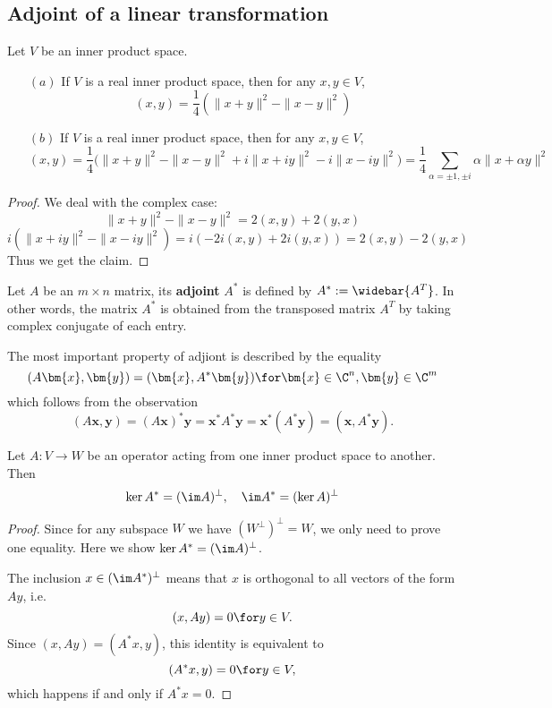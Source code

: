 \subsection{Adjoint of a linear transformation}
\begin{proposition}
Let $V$ be an inner product space.
\begin{itemize}
\item[$(a)$] If $V$ is a real inner product space, then for any $x,y\in V$,
\[(x,y)=\frac{1}{4}(\|x+y\|^2-\|x-y\|^2)\]
\item[$(b)$] If $V$ is a real inner product space, then for any $x,y\in V$,
\[(x,y)=\frac{1}{4}\Big(\|x+y\|^2-\|x-y\|^2+i\|x+iy\|^2-i\|x-iy\|^2\Big)=\frac{1}{4}\sum_{\alpha=\pm 1,\pm i}\alpha\|x+\alpha y\|^2\]
\end{itemize}
\end{proposition}
\begin{proof}
We deal with the complex case:
\[\|x+y\|^2-\|x-y\|^2=2(x,y)+2(y,x)\]
\[i(\|x+iy\|^2-\|x-iy\|^2)=i(-2i(x,y)+2i(y,x))=2(x,y)-2(y,x)\]
Thus we get the claim.
\end{proof}
\begin{definition}
Let $A$ be an $m\times n$ matrix, its \textbf{adjoint} $A^*$ is defined by $A^*:=\widebar{A^T}$. In other words, the matrix $A^*$ is obtained from the transposed matrix $A^T$ by taking complex conjugate of each entry.
\end{definition}
The most important property of adjiont is described by the equality
\[(A\bm{x},\bm{y})=(\bm{x},A^*\bm{y})\for \bm{x}\in\C^n,\bm{y}\in\C^m\]
which follows from the observation
\[(A\bm{x},\bm{y})=(A\bm{x})^*\bm{y}=\bm{x}^*A^*\bm{y}=\bm{x}^*(A^*\bm{y})=(\bm{x},A^*\bm{y}).\]
\begin{theorem}
Let $A:V\to W$ be an operator acting from one inner product
space to another. Then
\[\ker A^*=(\im A)^\bot,\quad\im A^*=(\ker A)^\bot\]
\end{theorem}
\begin{proof}
Since for any subspace $W$ we have $(W^\bot)^\bot=W$, we only need to prove one equality. Here we show $\ker A^*=(\im A)^\bot$.\par
The inclusion $x\in(\im A^*)^{\bot}$ means that $x$ is orthogonal to all vectors of the form $Ay$, i.e.
\[(x,Ay)=0\for y\in V.\]
Since $(x,Ay)=(A^*x,y)$, this identity is equivalent to
\[(A^*x,y)=0\for y\in V,\]
which happens if and only if $A^*x=0$.
\end{proof}
